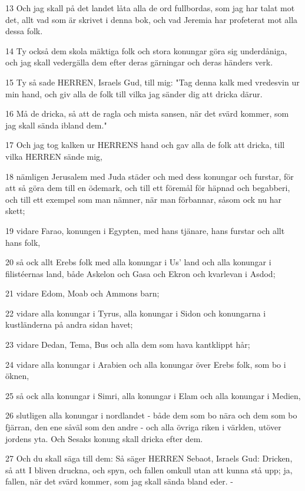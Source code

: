 \par 13 Och jag skall på det landet låta alla de ord fullbordas, som jag har talat mot det, allt vad som är skrivet i denna bok, och vad Jeremia har profeterat mot alla dessa folk.
\par 14 Ty också dem skola mäktiga folk och stora konungar göra sig underdåniga, och jag skall vedergälla dem efter deras gärningar och deras händers verk.
\par 15 Ty så sade HERREN, Israels Gud, till mig: "Tag denna kalk med vredesvin ur min hand, och giv alla de folk till vilka jag sänder dig att dricka därur.
\par 16 Må de dricka, så att de ragla och mista sansen, när det svärd kommer, som jag skall sända ibland dem."
\par 17 Och jag tog kalken ur HERRENS hand och gav alla de folk att dricka, till vilka HERREN sände mig,
\par 18 nämligen Jerusalem med Juda städer och med dess konungar och furstar, för att så göra dem till en ödemark, och till ett föremål för häpnad och begabberi, och till ett exempel som man nämner, när man förbannar, såsom ock nu har skett;
\par 19 vidare Farao, konungen i Egypten, med hans tjänare, hans furstar och allt hans folk,
\par 20 så ock allt Erebs folk med alla konungar i Us' land och alla konungar i filistéernas land, både Askelon och Gasa och Ekron och kvarlevan i Asdod;
\par 21 vidare Edom, Moab och Ammons barn;
\par 22 vidare alla konungar i Tyrus, alla konungar i Sidon och konungarna i kustländerna på andra sidan havet;
\par 23 vidare Dedan, Tema, Bus och alla dem som hava kantklippt hår;
\par 24 vidare alla konungar i Arabien och alla konungar över Erebs folk, som bo i öknen,
\par 25 så ock alla konungar i Simri, alla konungar i Elam och alla konungar i Medien,
\par 26 slutligen alla konungar i nordlandet - både dem som bo nära och dem som bo fjärran, den ene såväl som den andre - och alla övriga riken i världen, utöver jordens yta. Och Sesaks konung skall dricka efter dem.
\par 27 Och du skall säga till dem: Så säger HERREN Sebaot, Israels Gud: Dricken, så att I bliven druckna, och spyn, och fallen omkull utan att kunna stå upp; ja, fallen, när det svärd kommer, som jag skall sända bland eder. -
